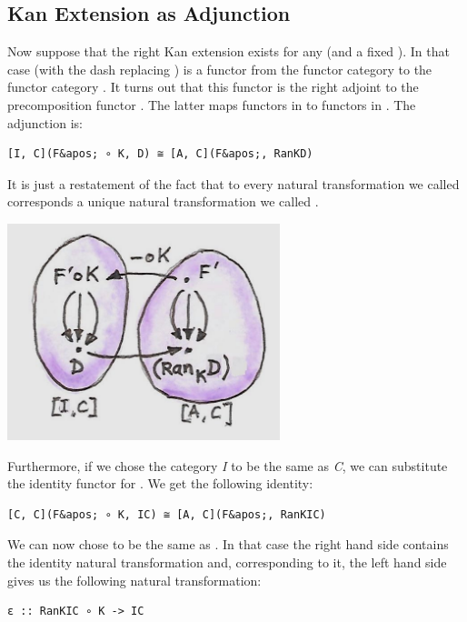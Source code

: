 \subsection{Kan Extension as
Adjunction}\label{kan-extension-as-adjunction}

Now suppose that the right Kan extension exists for any  (and
a fixed ). In that case  (with the dash
replacing ) is a functor from the functor category
\code{{[}I,\ C{]}} to the functor category \code{{[}A,\ C{]}}. It
turns out that this functor is the right adjoint to the precomposition
functor . The latter maps functors in \code{{[}A,\ C{]}}
to functors in \code{{[}I,\ C{]}}. The adjunction is:

\begin{verbatim}
[I, C](F&apos; ∘ K, D) ≅ [A, C](F&apos;, RanKD)
\end{verbatim}

It is just a restatement of the fact that to every natural
transformation we called  corresponds a unique natural
transformation we called .

\includegraphics[width=3.12500in]{images/kan92.jpg}

Furthermore, if we chose the category \emph{I} to be the same as
\emph{C}, we can substitute the identity functor  for
. We get the following identity:

\begin{verbatim}
[C, C](F&apos; ∘ K, IC) ≅ [A, C](F&apos;, RanKIC)
\end{verbatim}

We can now chose  to be the same as . In
that case the right hand side contains the identity natural
transformation and, corresponding to it, the left hand side gives us the
following natural transformation:

\begin{verbatim}
ε :: RanKIC ∘ K -> IC
\end{verbatim}

